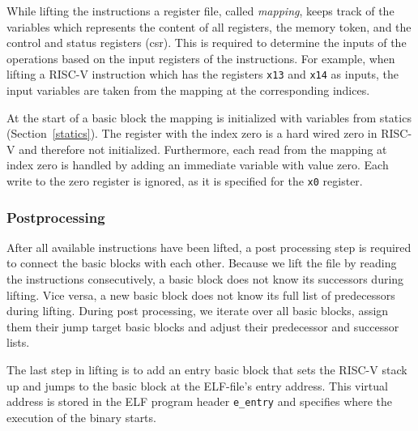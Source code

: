 \documentclass[course=eragp]{aspdoc}
\begin{document}
\par

While lifting the instructions a register file, called \emph{mapping}, keeps track of the variables
which represents the content of all registers, the memory token, and the control and status registers
(csr). This is required to determine the inputs of the operations based on the input registers of
the instructions. For example, when lifting a RISC-V instruction which has the registers \texttt{x13}
and \texttt{x14} as inputs, the input variables are taken from the mapping at the corresponding
indices.

\par

At the start of a basic block the mapping is initialized
with variables from statics (Section~\ref{statics}). The register with the index zero is a hard wired zero in
RISC-V and therefore not initialized. Furthermore, each read from the mapping at index zero is handled by adding an immediate
variable with value zero. Each write to the zero register is ignored, as it is specified for the \texttt{x0}
register.\cite{rvspec}

\subsubsection{Postprocessing}

After all available instructions have been lifted, a post processing step is required to connect
the basic blocks with each other. Because we lift the file by reading the instructions
consecutively, a basic block does not know its successors during lifting. Vice versa, a new basic
block does not know its full list of predecessors during lifting.
During post processing, we iterate over all basic blocks, assign them their jump target basic
blocks and adjust their predecessor and successor lists.

\par

The last step in lifting is to add an entry basic block that sets the RISC-V stack up and jumps to the
basic block at the ELF-file's entry address. This virtual address is stored in the ELF program header
\texttt{e\_entry} and specifies where the execution of the binary starts.\cite{elf_spec}
\end{document}
